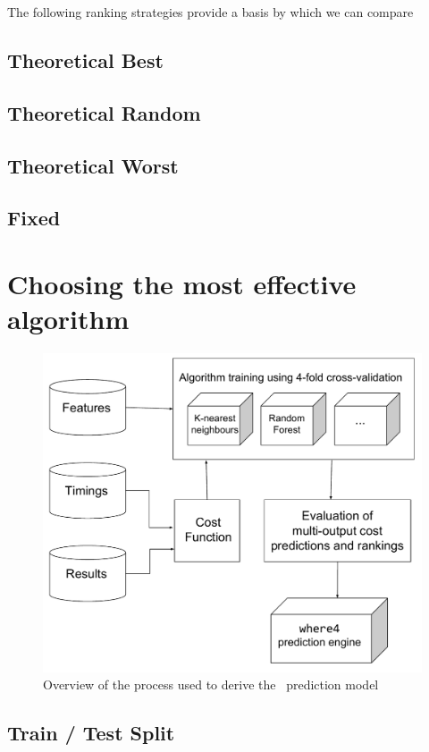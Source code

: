 The following ranking strategies provide a basis by which we can compare 

\subsection{Theoretical \textsf{Best}}
\subsection{Theoretical \textsf{Random}}
\subsection{Theoretical \textsf{Worst}}
\subsection{\textsf{Fixed}}

\section{Choosing the most effective algorithm}
\label{pred:choosing}
\begin{figure}
	\centering
	\includegraphics[width=0.9\linewidth]{Figures/Chapter4}
	\caption{Overview of the process used to derive the \where~prediction model}
	\label{fig:Chapter4}
\end{figure}

\subsection{Train / Test Split}
